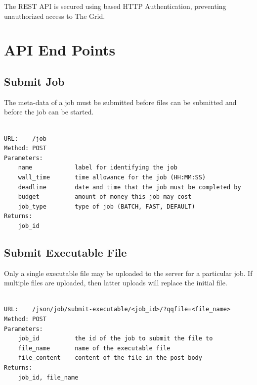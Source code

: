 The REST API is secured using based HTTP Authentication, preventing unauthorized access to The Grid.

\section{API End Points}
\label{apiendpoints}

\subsection{Submit Job}
\label{submitjob}

The meta-data of a job must be submitted before files can be submitted and before the job can be started.

\begin{adjustwidth}{2.5em}{2.5em}
\begin{verbatim}

URL:    /job
Method: POST
Parameters: 
    name            label for identifying the job
    wall_time       time allowance for the job (HH:MM:SS)
    deadline        date and time that the job must be completed by
    budget          amount of money this job may cost
    job_type        type of job (BATCH, FAST, DEFAULT)
Returns:    
    job_id

\end{verbatim}
\end{adjustwidth}

\subsection{Submit Executable File}
\label{submitexecutablefile}

Only a single executable file may be uploaded to the server for a particular job. If multiple files are uploaded, then latter uploads will replace the initial file.

\begin{adjustwidth}{2.5em}{2.5em}
\begin{verbatim}

URL:    /json/job/submit-executable/<job_id>/?qqfile=<file_name>
Method: POST
Parameters: 
    job_id          the id of the job to submit the file to
    file_name       name of the executable file
    file_content    content of the file in the post body
Returns:    
    job_id, file_name

\end{verbatim}
\end{adjustwidth}

